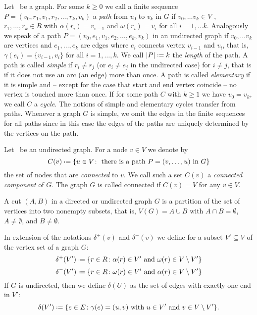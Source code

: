 \begin{definition}
	\label{def:pathscycles}
	Let \graph\ be a graph. For some $k \geq 0$ we call a finite sequence $P = (v_0, r_1, v_1, r_2, \dots, r_k, v_k)$ a \textit{path} from $v_0$ to $v_k$ in $G$ if $v_0, \ldots v_k \in V$ , $r_1, \ldots, r_k \in R$ with $\alpha(r_i) = v_{i-1}$ and $\omega(r_i) = v_i$ for all $i = 1, \dots  k$. Analogously we speak of a path $P = (v_0, e_1, v_1, e_2, \dots, e_k, v_k)$ in an	undirected graph if $v_0, \ldots v_k$ are vertices and $e_1, \ldots, e_k$ are edges where $e_i$ connects vertex $v_{i-1}$ and $v_i$, that is, $\gamma(e_i) = \{v_{i-1}, v_i\}$ for all $i = 1, \ldots, k$. We call $|P|\defeq k$ the \textit{length} of the path. A path is called \textit{simple} if $r_i \neq r_j$ (or $e_i \neq e_j$ in the undirected case) for $i \neq j$, that is if it does not use an arc (an edge) more than once. A path is called \textit{elementary} if it is simple and -- except for the case that start and end vertex coincide -- no vertex is touched more than once. If for some path $C$ with $k \geq 1$ we have $v_0 = v_k$, we call $C$ a \textit{cycle}. The notions of simple and elementary cycles transfer from paths. Whenever a graph $G$ is simple, we omit the edges in the finite sequences for all paths since in this case the edges of the paths are uniquely determined by the vertices on the path.	
\end{definition}

\begin{definition}
	\label{def:connectedcomponent}
	Let \ugraph\ be an undirected graph. For a node $v \in V$ we denote by
	$$C(v) \defeq \left \{ u \in V \colon \text{ there is a path } P = (v, \dots, u) \text{ in } G \right \} $$	
	the set of nodes that are \textit{connected} to $v$. We call such a set $C(v)$ a \textit{connected component} of $G$. The graph $G$ is called connected if $C(v) = V$ for any $v \in V$.\medskip
\end{definition}

\begin{definition}[Cut]
	\label{def:cut}
	A cut $(A, B)$ in a directed or undirected graph $G$ is a partition of the set of vertices into two nonempty subsets, that is, $V(G) = A \cup B$ with $A \cap B = \emptyset$, $A \neq \emptyset$, and $B \neq \emptyset$.
	
	In extension of the notations $\delta^+(v)$ and $\delta^-(v)$ we define for a subset $V' \subseteq V$ of the vertex set of a graph $G$:
	$$\delta^+(V') \defeq \{ r \in R \colon \alpha(r) \in V' \text{ and } \omega(r) \in V \setminus V' \}$$
	$$\delta^-(V') \defeq \{ r \in R \colon \omega(r) \in V' \text{ and } \alpha(r) \in V \setminus V' \}$$
	If $G$ is undirected, then we define $\delta(U)$ as the set of edges with exactly one end in $V'$:
	$$\delta(V') \defeq \{e \in E \colon \gamma(e) = (u, v) \text{ with } u \in V' \text{ and } v \in V \setminus V' \}.$$
\end{definition}


